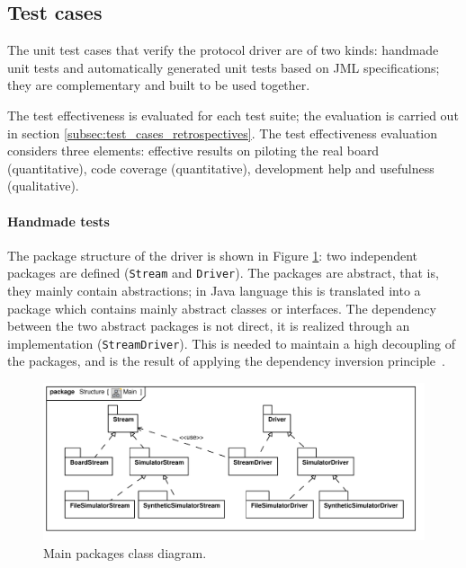 \documentclass[english]{lni}
\newcommand{\lil}[1]{\texttt{\lstinline|#1|}}
\begin{document}
\subsection{Test cases}
\label{subsec:test_cases}

The unit test cases that verify the protocol driver are of two kinds: handmade unit tests and automatically generated unit tests based on JML specifications; they are complementary and built to be used together.  

The test effectiveness is evaluated for each test suite; the evaluation is carried out in section \ref{subsec:test_cases_retrospectives}.
The test effectiveness evaluation considers three elements: effective results on piloting the real board (quantitative), code coverage
(quantitative), development help and usefulness (qualitative).

\paragraph*{Handmade tests}

The package structure of the driver is shown in Figure \ref{fig:class_diagram_main}: two independent packages are defined (\lil{Stream} and \lil{Driver}).  
The packages are abstract, that is, they mainly contain abstractions; in Java language this is translated into a package which contains mainly abstract classes or interfaces.  
The dependency between the two abstract packages is not direct, it is realized through an implementation (\lil{StreamDriver}).
This is needed to maintain a high decoupling of the packages, and is the result of applying the dependency inversion principle~\cite{Martin1996}.

\begin{figure}[htb!]
  \centering
  \includegraphics[scale=0.7]{UML_model/Class_Diagram__Structure__Main}
  \caption{Main packages class diagram.}
  \label{fig:class_diagram_main}
\end{figure}
\end{document}
